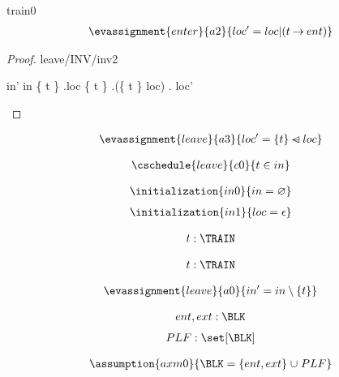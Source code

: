 \documentclass[12pt]{amsart}
\begin{document}
\begin{machine}{train0}
\begin{align*}
\evassignment{enter}{a2}
{	loc' = loc | (t \fun ent)	}
\end{align*}

\begin{proof}{leave/INV/inv2}
	\begin{calculation}
		in'
	\hint{=}{ \ref{a0} }
		in \setminus \{ t \}
	\hint{=}{ \ref{inv2} }
		\dom.loc \setminus \{ t \}
		\dom.(\{ t \} \domsub loc)
	\hint{=}{ \ref{a3} } 
		\dom. loc' 
	\end{calculation}
\end{proof}

\begin{align*}
\evassignment{leave}{a3}
{	loc' = \{ t \} \domsub loc 	}
\end{align*}

\begin{align*}
\cschedule{leave}{c0}
{	t \in in	}
\end{align*}

\begin{align*}
\initialization{in0}
{	in = \emptyset	}
\end{align*}
\begin{align*}
\initialization{in1}
{	loc = \emptyfun	}
\end{align*}


\begin{align*}
\indices{leave}{	t: \TRAIN}
\end{align*}

\begin{align*}
\indices{enter}{	t: \TRAIN}
\end{align*}

\begin{align*}
\evassignment{leave}{a0}
{	in' = in \setminus \{ t \}	}
\end{align*}

\begin{align*}
\constant{	ent,ext : \BLK}
\end{align*}
\begin{align*}
\constant{	PLF : \set [\BLK]}
\end{align*}

\begin{align*}
\assumption{axm0}
{	\BLK = \{ ent, ext \} \bunion PLF	}
\end{align*}


\end{machine}
\end{document}
